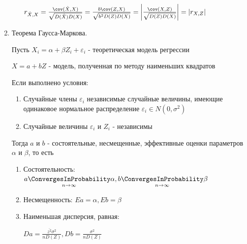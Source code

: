 \begin{enumerate}
\begin{enumerate}
\begin{MyProof}
            $r_{\hat X, X} = \frac{\cov (\hat X, X)}{\sqrt{D(\hat X) D(X)}} = \frac{b \cov (Z, X)}{\sqrt{b^2 D(Z) D(X)}} = \left|\frac{\cov (X, Z)}{\sqrt{D(Z) D(X)}}\right| = |r_{X, Z}|$
        \end{MyProof}
    \end{enumerate}

    \item Теорема Гаусса-Маркова.

    \begin{MyTheorem}
         Пусть $X_i = \alpha + \beta Z_i + \varepsilon_i$ - теоретическая модель регрессии

        $X = a + b Z$ - модель, полученная по методу наименьших квадратов

        Если выполнено условия:

        \begin{enumerate}[label=\asbuk*),ref=\asbuk*]
            \item Случайные члены $\varepsilon_i$ независимые случайные величины, имеющие одинаковое нормальное распределение $\varepsilon_i \in N(0, \sigma^2)$
            \item Случайные величины $\varepsilon_i$ и $Z_i$ - независимы
        \end{enumerate}

        Тогда $a$ и $b$ - состоятельные, несмещенные, эффективные оценки параметров $\alpha$ и $\beta$, то есть

        \begin{enumerate}
            \item Состоятельность: $a \underset{n \to \infty}{\ConvergesInProbability} \alpha, b \underset{n \to \infty}{\ConvergesInProbability} \beta$
            \item Несмещенность: $Ea = \alpha, Eb = \beta$
            \item Наименьшая дисперсия, равная:

            $D a = \frac{\overline{z^2} \sigma^2}{n D(Z)}, Db = \frac{\sigma^2}{n D(Z)}$
        \end{enumerate}
    \end{MyTheorem}



\end{enumerate}
